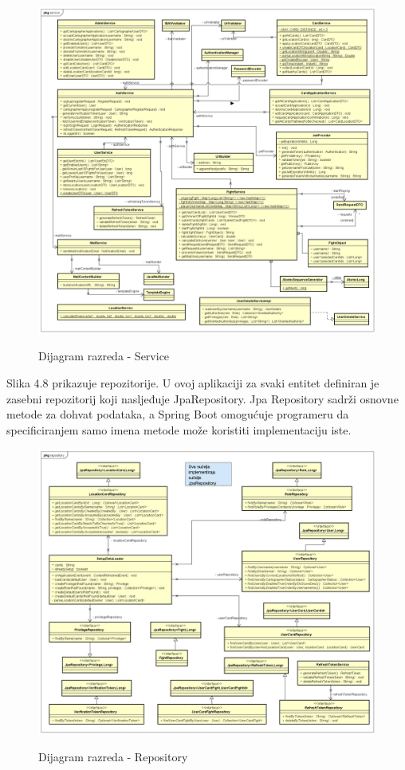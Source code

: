 			\begin{figure}[H]
				\centering
				\includegraphics[scale=0.5]{dijagrami/Service_CD} \\
				\caption{Dijagram razreda - Service}
				\label{fig:Service_CD}
			\end{figure}
		
			\textnormal{
				Slika 4.8 prikazuje repozitorije. U ovoj aplikaciji za svaki entitet definiran
				je zasebni repozitorij koji nasljeđuje JpaRepository. Jpa Repository sadrži osnovne
				metode za dohvat podataka, a Spring Boot omogućuje programeru da specificiranjem
				samo imena metode može koristiti implementaciju iste.
			}
		
				\begin{figure}[H]
				\centering
				\includegraphics[scale=0.5]{dijagrami/Repository_CD} \\
				\caption{Dijagram razreda - Repository}
				\label{fig:Repository_CD}
			\end{figure}
							
